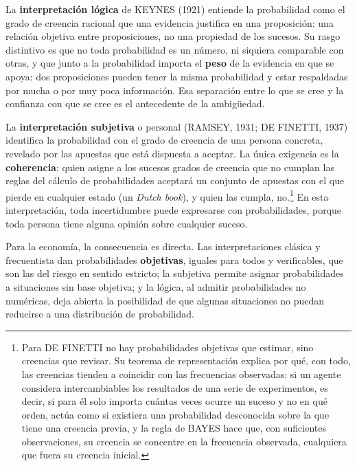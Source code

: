 \documentclass[10pt,a4paper]{article}
\begin{document}
La \textbf{interpretación lógica} de KEYNES (1921) entiende la probabilidad como el grado de creencia racional que una evidencia justifica en una proposición: una relación objetiva entre proposiciones, no una propiedad de los sucesos. Su rasgo distintivo es que no toda probabilidad es un número, ni siquiera comparable con otras, y que junto a la probabilidad importa el \textbf{peso} de la evidencia en que se apoya: dos proposiciones pueden tener la misma probabilidad y estar respaldadas por mucha o por muy poca información. Esa separación entre lo que se cree y la confianza con que se cree es el antecedente de la ambigüedad.

La \textbf{interpretación subjetiva} o personal (RAMSEY, 1931; DE FINETTI, 1937) identifica la probabilidad con el grado de creencia de una persona concreta, revelado por las apuestas que está dispuesta a aceptar. La única exigencia es la \textbf{coherencia}: quien asigne a los sucesos grados de creencia que no cumplan las reglas del cálculo de probabilidades aceptará un conjunto de apuestas con el que pierde en cualquier estado (un \textit{Dutch book}), y quien las cumpla, no.\footnote{%
    Para DE FINETTI no hay probabilidades objetivas que estimar, sino creencias que revisar. Su teorema de representación explica por qué, con todo, las creencias tienden a coincidir con las frecuencias observadas: si un agente considera intercambiables los resultados de una serie de experimentos, es decir, si para él solo importa cuántas veces ocurre un suceso y no en qué orden, actúa como si existiera una probabilidad desconocida sobre la que tiene una creencia previa, y la regla de BAYES hace que, con suficientes observaciones, su creencia se concentre en la frecuencia observada, cualquiera que fuera su creencia inicial.
} En esta interpretación, toda incertidumbre puede expresarse con probabilidades, porque toda persona tiene alguna opinión sobre cualquier suceso.

Para la economía, la consecuencia es directa. Las interpretaciones clásica y frecuentista dan probabilidades \textbf{objetivas}, iguales para todos y verificables, que son las del riesgo en sentido estricto; la subjetiva permite asignar probabilidades a situaciones sin base objetiva; y la lógica, al admitir probabilidades no numéricas, deja abierta la posibilidad de que algunas situaciones no puedan reducirse a una distribución de probabilidad.
\end{document}
